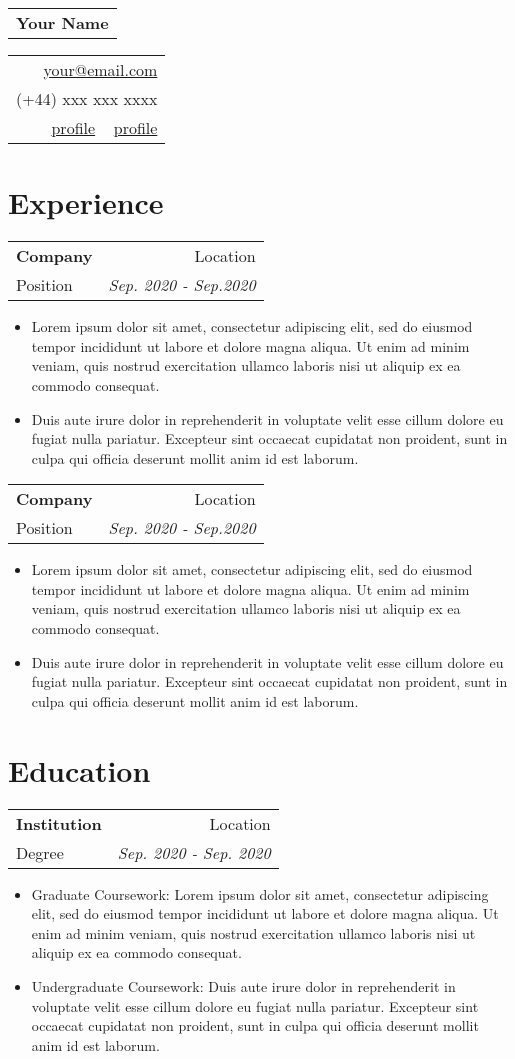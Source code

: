 \documentclass[11pt,letterpaper]{article}
\makeatletter
\newcommand{\myname}{Your Name}
\newcommand{\myemail}{your@email.com}
\newcommand{\myphone}{(+44) xxx xxx xxxx}
\newcommand{\mylinkedin}{profile}
\newcommand{\mygithub}{profile}
\newcommand{\namefont}[1]{{\normalfont\bfseries\Huge{#1}}}
\newcommand{\cvHeader}{
    \begin{tabular}[l]{@{}c@{}}
        \namefont{\myname}
    \end{tabular}\hfill%
    \begin{tabular}[c]{@{}r@{}}
        \href{mailto:\myemail}{\myemail} \\
        \hspace{0.2em} \myphone \\
        \faLinkedin \hspace{0.2em} \href{https://linkedin.com/in/\mylinkedin}{\mylinkedin} \textbullet\ \faGithub \hspace{0.2em} \href{https://github.com/\mygithub}{\mygithub}
    \end{tabular}%
    \vspace{-1em}
}
\newcommand{\cvEntryHeader}[4]{
    \begin{tabular*}{\textwidth}{@{}l@{\extracolsep{\fill}}r@{}}
        \textbf{#1}  & #3 \\
        #2 & \textit{#4}
    \end{tabular*}}
\newcommand{\cvListBegin}{\begin{itemize}[leftmargin=*]}
\newcommand{\cvListEnd}{\end{itemize}}
\newcommand{\cvListItem}{\item}
\makeatother
\begin{document}
    \thispagestyle{empty}

    \cvHeader

    \section*{Experience}
        \cvEntryHeader
            {Company}
            {Position}
            {Location}
            {Sep. 2020 - Sep.2020}

            \cvListBegin
                \cvListItem Lorem ipsum dolor sit amet, consectetur adipiscing elit, sed do eiusmod tempor incididunt ut labore et dolore magna aliqua. Ut enim ad minim veniam, quis nostrud exercitation ullamco laboris nisi ut aliquip ex ea commodo consequat.
                \cvListItem Duis aute irure dolor in reprehenderit in voluptate velit esse cillum dolore eu fugiat nulla pariatur. Excepteur sint occaecat cupidatat non proident, sunt in culpa qui officia deserunt mollit anim id est laborum.
            \cvListEnd

        \cvEntryHeader
            {Company}
            {Position}
            {Location}
            {Sep. 2020 - Sep.2020}

            \cvListBegin
                \cvListItem Lorem ipsum dolor sit amet, consectetur adipiscing elit, sed do eiusmod tempor incididunt ut labore et dolore magna aliqua. Ut enim ad minim veniam, quis nostrud exercitation ullamco laboris nisi ut aliquip ex ea commodo consequat.
                \cvListItem Duis aute irure dolor in reprehenderit in voluptate velit esse cillum dolore eu fugiat nulla pariatur. Excepteur sint occaecat cupidatat non proident, sunt in culpa qui officia deserunt mollit anim id est laborum.
            \cvListEnd

    \section*{Education}
        \cvEntryHeader
            {Institution}
            {Degree}
            {Location}
            {Sep. 2020 - Sep. 2020}

        \cvListBegin
            \cvListItem Graduate Coursework: Lorem ipsum dolor sit amet, consectetur adipiscing elit, sed do eiusmod tempor incididunt ut labore et dolore magna aliqua. Ut enim ad minim veniam, quis nostrud exercitation ullamco laboris nisi ut aliquip ex ea commodo consequat.
            \cvListItem Undergraduate Coursework: Duis aute irure dolor in reprehenderit in voluptate velit esse cillum dolore eu fugiat nulla pariatur. Excepteur sint occaecat cupidatat non proident, sunt in culpa qui officia deserunt mollit anim id est laborum.
        \cvListEnd
\end{document}
